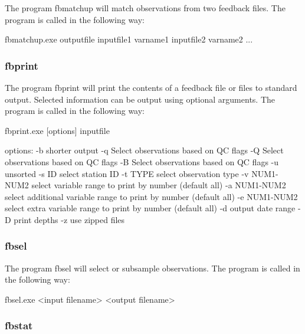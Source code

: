 \documentclass[../tex_main/NEMO_manual]{subfiles}
\begin{document}
The program fbmatchup will match observations from two feedback files. The program is called
in the following way:

\footnotesize
\begin{cmds}
fbmatchup.exe outputfile inputfile1 varname1 inputfile2 varname2 ...
\end{cmds}

\subsubsection{fbprint}

The program fbprint will print the contents of a feedback file or files to standard output.
Selected information can be output using optional arguments. The program is called in the
following way:

\footnotesize
\begin{cmds}
fbprint.exe [options] inputfile

options:
     -b            shorter output
     -q            Select observations based on QC flags
     -Q            Select observations based on QC flags
     -B            Select observations based on QC flags
     -u            unsorted
     -s ID         select station ID  
     -t TYPE       select observation type
     -v NUM1-NUM2  select variable range to print by number 
                      (default all)
     -a NUM1-NUM2  select additional variable range to print by number 
                      (default all)
     -e NUM1-NUM2  select extra variable range to print by number 
                      (default all)
     -d            output date range
     -D            print depths
     -z            use zipped files
\end{cmds}

\subsubsection{fbsel}

The program fbsel will select or subsample observations. The program is called in the
following way:

\footnotesize
\begin{cmds}
fbsel.exe <input filename> <output filename>
\end{cmds}

\subsubsection{fbstat}
\end{document}
